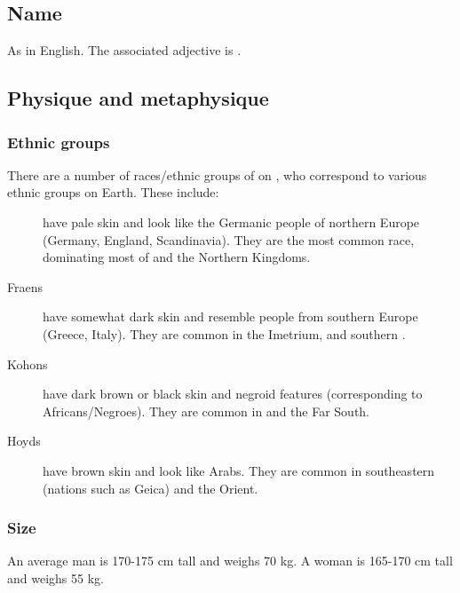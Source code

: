\subsection{Name}
As in English. The associated adjective is \emph{\human{}}. 





\subsection{Physique and metaphysique}
\subsubsection{Ethnic groups}
There are a number of races/ethnic groups of \humans{} on \Miith{}, who correspond to various ethnic groups on Earth. These include: 

\begin{description}
  \item[{\Velcadians}] 
    have pale skin and look like the Germanic people of northern Europe (Germany, England, Scandinavia). They are the most common \human{} race, dominating most of \Velcad{} and the Northern Kingdoms. 
  \item[{Fraens}] 
    have somewhat dark skin and resemble people from southern Europe (Greece, Italy). They are common in the Imetrium, \Durcac and southern \Velcad{}. 
  \item[{Kohons}] 
    have dark brown or black skin and negroid features (corresponding to Africans/Negroes). They are common in \Durcac and the Far South. 
  \item[{Hoyds}] 
    have brown skin and look like Arabs. They are common in southeastern \Velcad{} (nations such as Geica) and the Orient. 
\end{description}





\subsubsection{Size}
An average \Miithian{} \human{} man is 170-175 cm tall and weighs 70 kg. A woman is 165-170 cm tall and weighs 55 kg. 





